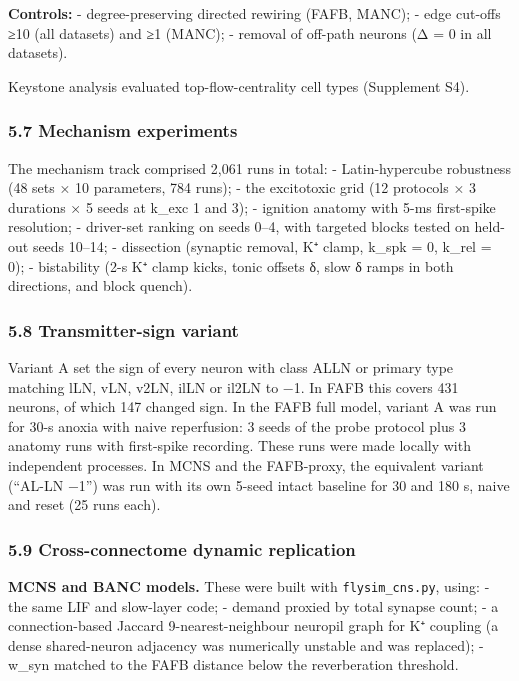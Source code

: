 \documentclass[11pt]{article}
\begin{document}
\textbf{Controls:}
- degree-preserving directed rewiring (FAFB, MANC);
- edge cut-offs ≥10 (all datasets) and ≥1 (MANC);
- removal of off-path neurons (Δ = 0 in all datasets).

Keystone analysis evaluated top-flow-centrality cell types (Supplement S4).

\subsubsection{5.7 Mechanism experiments}\label{mechanism-experiments}

The mechanism track comprised 2,061 runs in total:
- Latin-hypercube robustness (48 sets × 10 parameters, 784 runs);
- the excitotoxic grid (12 protocols × 3 durations × 5 seeds at k\_exc 1 and 3);
- ignition anatomy with 5-ms first-spike resolution;
- driver-set ranking on seeds 0--4, with targeted blocks tested on held-out seeds 10--14;
- dissection (synaptic removal, K⁺ clamp, k\_spk = 0, k\_rel = 0);
- bistability (2-s K⁺ clamp kicks, tonic offsets δ, slow δ ramps in both directions, and block quench).

\subsubsection{5.8 Transmitter-sign variant}\label{transmitter-sign-variant}

Variant A set the sign of every neuron with class ALLN or primary type matching lLN, vLN, v2LN, ilLN or il2LN to −1. In FAFB this covers 431 neurons, of which 147 changed sign. In the FAFB full model, variant A was run for 30-s anoxia with naive reperfusion: 3 seeds of the probe protocol plus 3 anatomy runs with first-spike recording. These runs were made locally with independent processes. In MCNS and the FAFB-proxy, the equivalent variant (``AL-LN −1'') was run with its own 5-seed intact baseline for 30 and 180 s, naive and reset (25 runs each).

\subsubsection{5.9 Cross-connectome dynamic replication}\label{cross-connectome-dynamic-replication}

\textbf{MCNS and BANC models.} These were built with \texttt{flysim\_cns.py}, using:
- the same LIF and slow-layer code;
- demand proxied by total synapse count;
- a connection-based Jaccard 9-nearest-neighbour neuropil graph for K⁺ coupling (a dense shared-neuron adjacency was numerically unstable and was replaced);
- w\_syn matched to the FAFB distance below the reverberation threshold.
\end{document}
